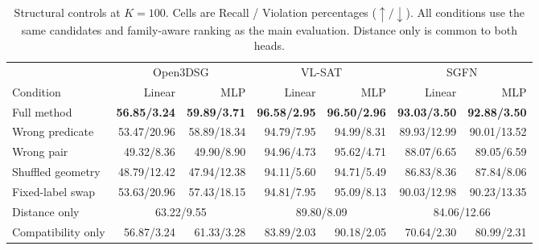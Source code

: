 \begin{table}[t]
\centering
{\small
\setlength{\tabcolsep}{2.8pt}
\begin{tabular}{@{}lrrrrrr@{}}
\toprule
& \multicolumn{2}{c}{Open3DSG} & \multicolumn{2}{c}{VL-SAT} & \multicolumn{2}{c}{SGFN} \\
\cmidrule(lr){2-3}\cmidrule(lr){4-5}\cmidrule(lr){6-7}
Condition & Linear & MLP & Linear & MLP & Linear & MLP \\
\midrule
Full method & \textbf{56.85/3.24} & \textbf{59.89/3.71} & \textbf{96.58/2.95} & \textbf{96.50/2.96} & \textbf{93.03/3.50} & \textbf{92.88/3.50} \\
Wrong predicate & 53.47/20.96 & 58.89/18.34 & 94.79/7.95 & 94.99/8.31 & 89.93/12.99 & 90.01/13.52 \\
Wrong pair & 49.32/8.36 & 49.90/8.90 & 94.96/4.73 & 95.62/4.71 & 88.07/6.65 & 89.05/6.59 \\
Shuffled geometry & 48.79/12.42 & 47.94/12.38 & 94.11/5.60 & 94.71/5.49 & 86.83/8.36 & 87.84/8.06 \\
Fixed-label swap & 53.63/20.96 & 57.43/18.15 & 94.81/7.95 & 95.09/8.13 & 90.03/12.98 & 90.23/13.35 \\
Distance only & \multicolumn{2}{c}{63.22/9.55} & \multicolumn{2}{c}{89.80/8.09} & \multicolumn{2}{c}{84.06/12.66} \\
Compatibility only & 56.87/3.24 & 61.33/3.28 & 83.89/2.03 & 90.18/2.05 & 70.64/2.30 & 80.99/2.31 \\
\bottomrule
\end{tabular}
}
\caption{Structural controls at $K=100$. Cells are Recall / Violation
percentages ($\uparrow/\downarrow$). All conditions use the same candidates
and family-aware ranking as the main evaluation. Distance only is common to
both heads.}
\label{tab:ablations-k100}
\end{table}

